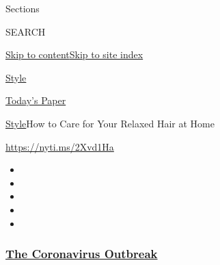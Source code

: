 Sections

SEARCH

\protect\hyperlink{site-content}{Skip to
content}\protect\hyperlink{site-index}{Skip to site index}

\href{https://www.nytimes3xbfgragh.onion/section/style}{Style}

\href{https://myaccount.nytimes3xbfgragh.onion/auth/login?response_type=cookie\&client_id=vi}{}

\href{https://www.nytimes3xbfgragh.onion/section/todayspaper}{Today's
Paper}

\href{/section/style}{Style}\textbar{}How to Care for Your Relaxed Hair
at Home

\url{https://nyti.ms/2Xvd1Ha}

\begin{itemize}
\item
\item
\item
\item
\item
\end{itemize}

\hypertarget{the-coronavirus-outbreak}{%
\subsubsection{\texorpdfstring{\href{https://www.nytimes3xbfgragh.onion/news-event/coronavirus?name=styln-coronavirus-national\&region=TOP_BANNER\&block=storyline_menu_recirc\&action=click\&pgtype=Article\&impression_id=d8a9a5b0-f27a-11ea-acdb-e90d0686ccfb\&variant=undefined}{The
Coronavirus
Outbreak}}{The Coronavirus Outbreak}}\label{the-coronavirus-outbreak}}

